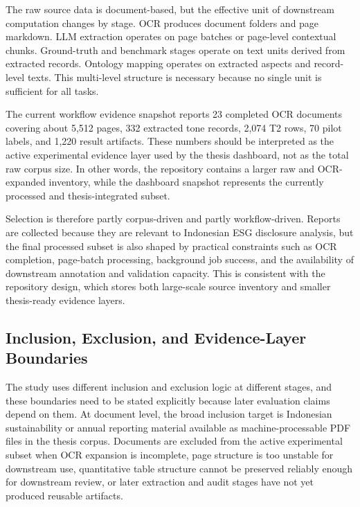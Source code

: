 \documentclass[english, online, cse, master]{dithesis}
\begin{document}
The raw source data is document-based, but the effective unit of downstream computation changes by stage. OCR produces document folders and page markdown. LLM extraction operates on page batches or page-level contextual chunks. Ground-truth and benchmark stages operate on text units derived from extracted records. Ontology mapping operates on extracted aspects and record-level texts. This multi-level structure is necessary because no single unit is sufficient for all tasks.

The current workflow evidence snapshot  reports 23 completed OCR documents covering about 5,512 pages, 332 extracted tone records, 2,074 T2 rows, 70 pilot labels, and 1,220 result artifacts. These numbers should be interpreted as the active experimental evidence layer used by the thesis dashboard, not as the total raw corpus size. In other words, the repository contains a larger raw and OCR-expanded inventory, while the dashboard snapshot represents the currently processed and thesis-integrated subset.

Selection is therefore partly corpus-driven and partly workflow-driven. Reports are collected because they are relevant to Indonesian ESG disclosure analysis, but the final processed subset is also shaped by practical constraints such as OCR completion, page-batch processing, background job success, and the availability of downstream annotation and validation capacity. This is consistent with the repository design, which stores both large-scale source inventory and smaller thesis-ready evidence layers.

\subsection{Inclusion, Exclusion, and Evidence-Layer Boundaries}

The study uses different inclusion and exclusion logic at different stages, and these boundaries need to be stated explicitly because later evaluation claims depend on them. At document level, the broad inclusion target is Indonesian sustainability or annual reporting material available as machine-processable PDF files in the thesis corpus. Documents are excluded from the active experimental subset when OCR expansion is incomplete, page structure is too unstable for downstream use, quantitative table structure cannot be preserved reliably enough for downstream review, or later extraction and audit stages have not yet produced reusable artifacts.
\end{document}
